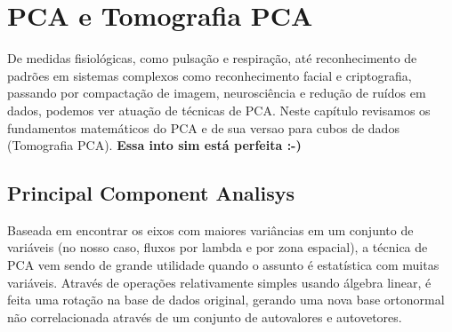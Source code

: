 


\chapter{PCA e Tomografia PCA}
\label{sec:PCAeTomoPCA}

De medidas fisiológicas, como pulsação e respiração, até reconhecimento de
padrões em sistemas complexos como reconhecimento facial e criptografia,
passando por compactação de imagem, neurosciência e redução de ruídos em dados,
podemos ver atuação de técnicas de PCA. Neste capítulo revisamos os fundamentos matemáticos do PCA e de sua versao para cubos de dados (Tomografia PCA).
{\bf Essa into sim está perfeita :-)}


\section{Principal Component Analisys}
\label{sec:PCAeTomoPCA:PCA}

Baseada em encontrar os eixos com maiores variâncias em um conjunto de variáveis
(no nosso caso, fluxos por lambda e por zona espacial), a técnica de PCA vem sendo de grande
utilidade quando o assunto é estatística com muitas variáveis. Através de
operações relativamente simples usando álgebra linear, é
feita uma rotação na base de dados original, gerando uma nova base ortonormal
não correlacionada através de um conjunto de autovalores e autovetores.

